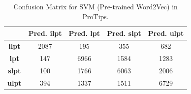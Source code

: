 \documentclass[11pt,a4paper]{article}
\begin{document}
\begin{table}[h!]
\centering
\begin{tabular}{c|c|c|c|c|}
\cline{2-5}
                                                            & \cellcolor[HTML]{EFEFEF}\textbf{Pred. ilpt} & \cellcolor[HTML]{EFEFEF}\textbf{Pred. lpt} & \cellcolor[HTML]{EFEFEF}\textbf{Pred. slpt} & \cellcolor[HTML]{EFEFEF}\textbf{Pred. ulpt} \\ \hline
\multicolumn{1}{|c|}{\cellcolor[HTML]{EFEFEF}\textbf{ilpt}} & 2087                                        & 195                                        & 355                                         & 682                                         \\ \hline
\multicolumn{1}{|c|}{\cellcolor[HTML]{EFEFEF}\textbf{lpt}}  & 147                                         & 6966                                       & 1584                                        & 1283                                        \\ \hline
\multicolumn{1}{|c|}{\cellcolor[HTML]{EFEFEF}\textbf{slpt}} & 100                                         & 1766                                       & 6063                                        & 2006                                        \\ \hline
\multicolumn{1}{|c|}{\cellcolor[HTML]{EFEFEF}\textbf{ulpt}} & 394                                         & 1337                                       & 1511                                        & 6729                                        \\ \hline
\end{tabular}
\caption{Confusion Matrix for SVM (Pre-trained Word2Vec) in ProTips.}
\label{table:svm2_w2v}
\end{table}
\end{document}
